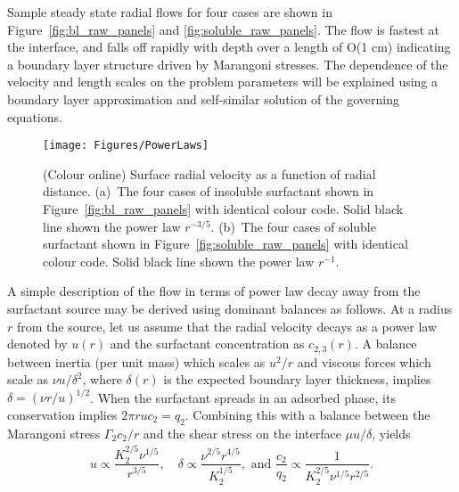 \documentclass[]{jfm}
\begin{document}
Sample steady state radial flows for four cases are shown in Figure~\ref{fig:bl_raw_panels} and \ref{fig:soluble_raw_panels}.
The flow is fastest at the interface, and falls off rapidly with depth over a length of O(1 cm) indicating a boundary layer structure driven by Marangoni stresses.
The dependence of the velocity and length scales on the problem parameters will be explained using a boundary layer approximation and self-similar solution of the governing equations.

\begin{figure}
\centerline{\texttt{[image: Figures/PowerLaws]}}
\caption{(Colour online) Surface radial velocity as a function of radial distance. (a)~The four cases of insoluble surfactant shown in Figure~\ref{fig:bl_raw_panels} with identical colour code. Solid black line shown the power law $r^{-3/5}$. (b)~The four cases of soluble surfactant shown in Figure~\ref{fig:soluble_raw_panels} with identical colour code. Solid black line shown the power law $r^{-1}$.}
\label{fig:PowerLaws}
\end{figure}

A simple description of the flow in terms of power law decay away from the surfactant source may be derived using dominant balances as follows.
At a radius $r$ from the source, let us assume that the radial velocity decays as a power law denoted by $u(r)$ and the surfactant concentration as $c_{2,3}(r)$.
A balance between inertia (per unit mass) which scales as $u^2/r$ and viscous forces which scale as $\nu u/\delta^2$, where $\delta(r)$ is the expected boundary layer thickness, implies $\delta = (\nu r/ u)^{1/2}$.
When the surfactant spreads in an adsorbed phase, its conservation implies $2 \pi r u c_2 = q_2$.
Combining this with a balance between the Marangoni stress $\Gamma_2 c_2/r$ and the shear stress on the interface $\mu u/\delta$, yields 
\begin{align}
u \propto \dfrac{K_2^{2/5} \nu^{1/5}}{r^{3/5}}, \quad \delta \propto \dfrac{\nu^{2/5} r^{4/5}}{K_2^{1/5}}, \text{ and } \dfrac{c_2}{q_2} \propto \dfrac{1}{K_2^{2/5} \nu^{1/5} r^{2/5}}.
\label{eqn:insolpowerlaws}
\end{align}
\end{document}
